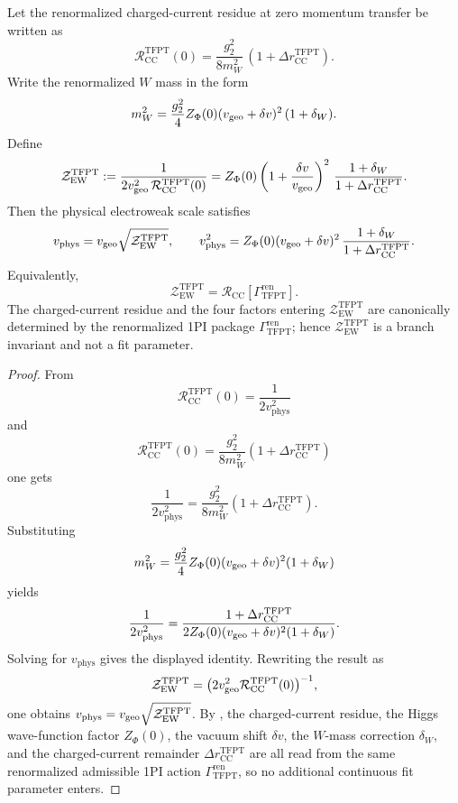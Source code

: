 \begin{theorem}
\label{thm:ew-geometric-to-physical-matching}
Let the renormalized charged-current residue at zero momentum transfer be written as
\[
\mathcal R_{\mathrm{CC}}^{\mathrm{TFPT}}(0)
=
\frac{g_2^2}{8m_W^2}\,(1+\Delta r_{\mathrm{CC}}^{\mathrm{TFPT}}).
\]
Write the renormalized $W$ mass in the form
\[
m_W^2=
\frac{g_2^2}{4}Z_\Phi(0)(v_{\mathrm{geo}}+\delta v)^2\,(1+\delta_W).
\]
Define
\[
\mathcal Z_{\mathrm{EW}}^{\mathrm{TFPT}}
:=
 \frac{1}{2v_{\mathrm{geo}}^2\,\mathcal R_{\mathrm{CC}}^{\mathrm{TFPT}}(0)}
 =
Z_\Phi(0)\left(1+\frac{\delta v}{v_{\mathrm{geo}}}\right)^2
\,\frac{1+\delta_W}{1+\Delta r_{\mathrm{CC}}^{\mathrm{TFPT}}}.
\]
Then the physical electroweak scale satisfies
\[
v_{\mathrm{phys}}
=
v_{\mathrm{geo}}\sqrt{\mathcal Z_{\mathrm{EW}}^{\mathrm{TFPT}}},
\qquad
v_{\mathrm{phys}}^2
=
Z_\Phi(0)(v_{\mathrm{geo}}+\delta v)^2\,\frac{1+\delta_W}{1+\Delta r_{\mathrm{CC}}^{\mathrm{TFPT}}}.
\]
Equivalently,
\[
\mathcal Z_{\mathrm{EW}}^{\mathrm{TFPT}}
=
\mathcal R_{\mathrm{CC}}\!\left[\Gamma_{\mathrm{TFPT}}^{\mathrm{ren}}\right].
\]
The charged-current residue and the four factors entering $\mathcal Z_{\mathrm{EW}}^{\mathrm{TFPT}}$
are canonically determined by the renormalized 1PI package $\Gamma_{\mathrm{TFPT}}^{\mathrm{ren}}$;
hence
$\mathcal Z_{\mathrm{EW}}^{\mathrm{TFPT}}$ is a branch invariant and not a fit parameter.
\end{theorem}

\begin{proof}
From
\[
\mathcal R_{\mathrm{CC}}^{\mathrm{TFPT}}(0)=\frac{1}{2v_{\mathrm{phys}}^2}
\]
and
\[
\mathcal R_{\mathrm{CC}}^{\mathrm{TFPT}}(0)=\frac{g_2^2}{8m_W^2}(1+\Delta r_{\mathrm{CC}}^{\mathrm{TFPT}})
\]
one gets
\[
\frac{1}{2v_{\mathrm{phys}}^2}
=
\frac{g_2^2}{8m_W^2}(1+\Delta r_{\mathrm{CC}}^{\mathrm{TFPT}}).
\]
Substituting
\[
m_W^2=
\frac{g_2^2}{4}Z_\Phi(0)(v_{\mathrm{geo}}+\delta v)^2(1+\delta_W)
\]
yields
\[
\frac{1}{2v_{\mathrm{phys}}^2}
=
\frac{1+\Delta r_{\mathrm{CC}}^{\mathrm{TFPT}}}
{2Z_\Phi(0)(v_{\mathrm{geo}}+\delta v)^2(1+\delta_W)}.
\]
Solving for $v_{\mathrm{phys}}$ gives the displayed identity. Rewriting the result as
\[
\mathcal Z_{\mathrm{EW}}^{\mathrm{TFPT}}
=
\bigl(2v_{\mathrm{geo}}^2\mathcal R_{\mathrm{CC}}^{\mathrm{TFPT}}(0)\bigr)^{-1},
\]
one obtains $v_{\mathrm{phys}}=v_{\mathrm{geo}}\sqrt{\mathcal Z_{\mathrm{EW}}^{\mathrm{TFPT}}}$. By
, the charged-current residue, the Higgs wave-function factor
$Z_\Phi(0)$, the vacuum shift $\delta v$, the $W$-mass correction $\delta_W$, and the charged-current
remainder $\Delta r_{\mathrm{CC}}^{\mathrm{TFPT}}$ are all read from the same renormalized
admissible 1PI action $\Gamma_{\mathrm{TFPT}}^{\mathrm{ren}}$, so no additional continuous fit
parameter enters.
\end{proof}
